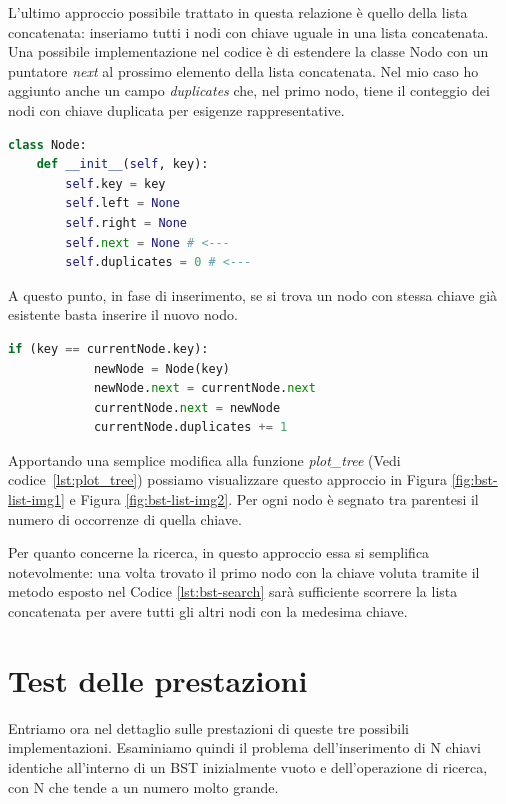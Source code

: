 \documentclass{article}
\begin{document}
L'ultimo approccio possibile trattato in questa relazione è quello  della lista concatenata: inseriamo tutti i nodi con chiave uguale in una lista concatenata.
Una possibile implementazione nel codice è di estendere la classe Nodo con un puntatore \textit{next} al prossimo elemento della lista concatenata. Nel mio caso ho aggiunto anche un campo   \textit{duplicates} che, nel primo nodo, tiene il conteggio dei nodi con chiave duplicata per esigenze rappresentative.

\begin{lstlisting}[language=Python, caption={Classe Nodo di un BST con lista concatenata}]
class Node:
    def __init__(self, key):
        self.key = key
        self.left = None
        self.right = None
        self.next = None # <---
        self.duplicates = 0 # <---
\end{lstlisting}

A questo punto, in fase di inserimento, se si trova un nodo con stessa chiave già esistente basta inserire il nuovo nodo.

\begin{lstlisting}[language=Python, caption={Gestione chiavi duplicate con lista concatenata}]
     if (key == currentNode.key):
            newNode = Node(key)
            newNode.next = currentNode.next
            currentNode.next = newNode
            currentNode.duplicates += 1

\end{lstlisting}

\vspace{20px}


Apportando una semplice modifica alla funzione \textit{plot\_tree} (Vedi codice~\ref{lst:plot_tree}) possiamo visualizzare questo approccio in Figura \ref{fig:bst-list-img1} e Figura \ref{fig:bst-list-img2}.
Per ogni nodo è segnato tra parentesi il numero di occorrenze di quella chiave.

Per quanto concerne la ricerca, in questo approccio essa si semplifica notevolmente:
una volta trovato il primo nodo con la chiave voluta tramite il metodo esposto nel Codice \ref{lst:bst-search} sarà sufficiente scorrere la lista concatenata per avere tutti gli altri nodi con la medesima chiave.


\section{Test delle prestazioni}
Entriamo ora nel dettaglio sulle prestazioni di queste tre possibili implementazioni.
Esaminiamo quindi il problema dell'inserimento di N chiavi identiche all'interno di un BST inizialmente vuoto e dell'operazione di ricerca, con N che tende a un numero molto grande.
\end{document}
